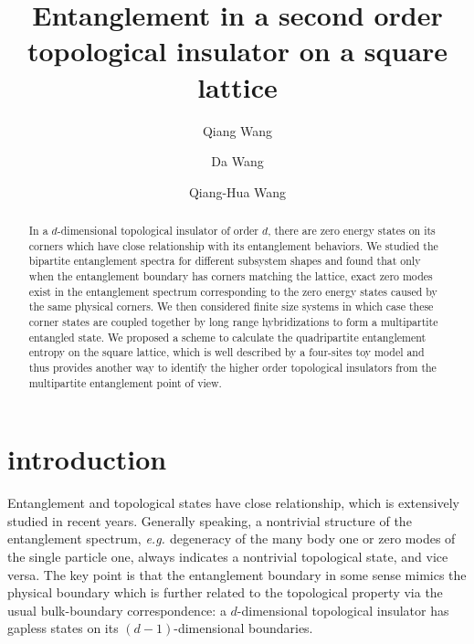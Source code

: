 \documentclass[twocolumn,superscriptaddress]{revtex4-1}
\newcommand{\eg}{\textit{e.g.{ }}}
\begin{document}
\title{Entanglement in a second order topological insulator on a square lattice}
\author{Qiang Wang}
\author{Da Wang} %
\author{Qiang-Hua Wang} %

\begin{abstract}
  In a $d$-dimensional topological insulator of order $d$, there are zero energy states on its corners which have close relationship with its entanglement behaviors. We studied the bipartite entanglement spectra for different subsystem shapes and found that only when the entanglement boundary has corners matching the lattice, exact zero modes exist in the entanglement spectrum corresponding to the zero energy states caused by the same physical corners. We then considered finite size systems in which case these corner states are coupled together by long range hybridizations to form a multipartite entangled state. We proposed a scheme to calculate the quadripartite entanglement entropy on the square lattice, which is well described by a four-sites toy model and thus provides another way to identify the higher order topological insulators from the multipartite entanglement point of view.
\end{abstract}
\maketitle
\section{introduction}
Entanglement and topological states have close relationship, which is extensively studied in recent years. \cite{Kitaev_PRL_2006, Levin_PRL_2006, Ryu_PRB_2006, Li_PRL_2008, Fidkowski_PRL_2010, Pollmann_PRB_2010, Yao_PRL_2010, Turner_PRB_2011, Zhang_PRL_2011, Huang_PRB_2012, Qi_PRL_2012, Jiang_PRL_2013, Chandran_PRL_2014, Wang_PRB_2015, Zeng_a_2015, Laflorencie_PR_2016, Koch-Janusz_PRB_2017} Generally speaking, a nontrivial structure of the entanglement spectrum, \eg degeneracy of the many body one or zero modes of the single particle one, always indicates a nontrivial topological state, and vice versa. \cite{Ryu_PRB_2006, Li_PRL_2008, Fidkowski_PRL_2010, Qi_PRL_2012} The key point is that the entanglement boundary in some sense mimics the physical boundary which is further related to the topological property via the usual bulk-boundary correspondence: a $d$-dimensional topological insulator has gapless states on its $(d-1)$-dimensional boundaries. \cite{Hatsugai_PRL_1993, Qi_PRB_2006, Qi_PRB_2008, Schnyder_PRB_2008}
\end{document}
